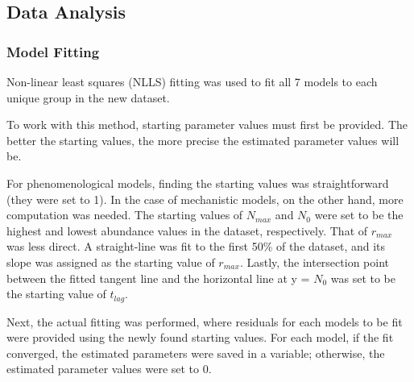 \documentclass[11pt]{article}
\begin{document}
\begin{linenumbers}
	\subsection{Data Analysis}
	\subsubsection{Model Fitting}
	Non-linear least squares (NLLS) fitting was used to fit all 7 models to each unique group in the new dataset. 
	\par To work with this method, starting parameter values must first be provided. The better the starting values, the more precise the estimated parameter values will be.
	\par For phenomenological models, finding the starting values was straightforward (they were set to 1). In the case of mechanistic models, on the other hand, more computation was needed. The starting values of $N_{max}$ and $N_0$ were set to be the highest and lowest abundance values in the dataset, respectively. That of $r_{max}$ was less direct. A straight-line was fit to the first 50\% of the dataset, and its slope was assigned as the starting value of $r_{max}$. Lastly, the intersection point between the fitted tangent line and the horizontal line at y = $N_0$ was set to be the starting value of $t_{lag}$.
	\par Next, the actual fitting was performed, where residuals for each models to be fit were provided using the newly found starting values. For each model, if the fit converged, the estimated parameters were saved in a variable; otherwise, the estimated parameter values were set to 0. 

\end{linenumbers}
\end{document}

